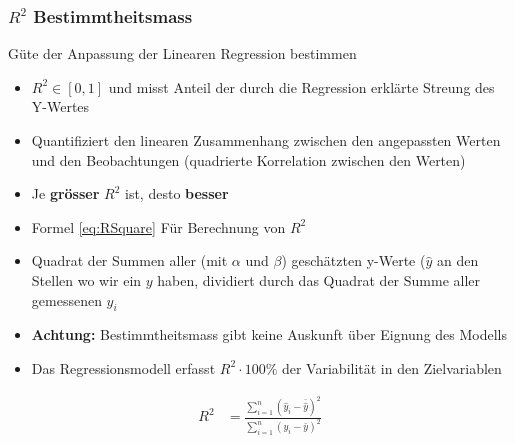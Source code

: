 \subsubsection{$R^2$ Bestimmtheitsmass}
\label{subsubsec:R2Bestimmtheitsmass}
Güte der Anpassung der Linearen Regression bestimmen
\begin{itemize}
	\item $R^2\in\left[0,1\right]$ und misst Anteil der durch die Regression erklärte Streung des Y-Wertes 
	\item Quantifiziert den linearen Zusammenhang zwischen den angepassten Werten und den Beobachtungen (quadrierte Korrelation zwischen den Werten)
	\item Je \textbf{grösser} $R^2$ ist, desto \textbf{besser}
	\item Formel \ref{eq:RSquare} Für Berechnung von $R^2$
	\item Quadrat der Summen aller (mit $\alpha$ und $\beta$) geschätzten y-Werte ($\hat{y}$ an den Stellen wo wir ein $y$ haben, dividiert durch das Quadrat der Summe aller gemessenen $y_i$
	\item \textbf{Achtung:} Bestimmtheitsmass gibt keine Auskunft über Eignung des Modells
	\item Das Regressionsmodell erfasst $R^2\cdot 100\%$ der Variabilität in den Zielvariablen
\end{itemize}

\begin{align}
\label{eq:RSquare}
R^2 &= \frac{\sum_{i=1}^{n}\left(\hat{y}_i-\bar{\hat{y}}\right)^2}{\sum_{i=1}^{n}\left(y_i-\bar{y}\right)^2}
\end{align}



